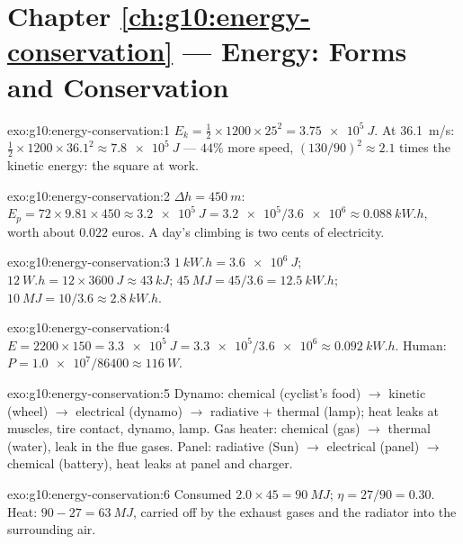 \section*{Chapter \ref{ch:g10:energy-conservation} --- Energy: Forms and Conservation}

\begin{solution}{exo:g10:energy-conservation:1}
$E_k = \tfrac12 \times 1200 \times 25^2 = \qty{3.75e5}{J}$. At
\qty{36.1}{m/s}: $\tfrac12 \times 1200 \times 36.1^2 \approx
\qty{7.8e5}{J}$ --- $44\%$ more speed, $(130/90)^2 \approx 2.1$
times the kinetic energy: the square at work.
\end{solution}

\begin{solution}{exo:g10:energy-conservation:2}
$\Delta h = \qty{450}{m}$:
$E_p = 72 \times 9.81 \times 450 \approx \qty{3.2e5}{J}
= \num{3.2e5}/\num{3.6e6} \approx \qty{0.088}{kW.h}$, worth about
$0.022$ euros. A day's climbing is two cents of electricity.
\end{solution}

\begin{solution}{exo:g10:energy-conservation:3}
$\qty{1}{kW.h} = \qty{3.6e6}{J}$;
$\qty{12}{W.h} = 12 \times \qty{3600}{J} \approx \qty{43}{kJ}$;
$\qty{45}{MJ} = 45/3.6 = \qty{12.5}{kW.h}$;
$\qty{10}{MJ} = 10/3.6 \approx \qty{2.8}{kW.h}$.
\end{solution}

\begin{solution}{exo:g10:energy-conservation:4}
$E = 2200 \times 150 = \qty{3.3e5}{J}
= \num{3.3e5}/\num{3.6e6} \approx \qty{0.092}{kW.h}$. Human:
$P = \num{1.0e7}/\num{86400} \approx \qty{116}{W}$.
\end{solution}

\begin{solution}{exo:g10:energy-conservation:5}
Dynamo: chemical (cyclist's food) $\to$ kinetic (wheel) $\to$
electrical (dynamo) $\to$ radiative $+$ thermal (lamp); heat leaks
at muscles, tire contact, dynamo, lamp. Gas heater: chemical (gas)
$\to$ thermal (water), leak in the flue gases. Panel: radiative
(Sun) $\to$ electrical (panel) $\to$ chemical (battery), heat leaks
at panel and charger.
\end{solution}

\begin{solution}{exo:g10:energy-conservation:6}
Consumed $2.0 \times 45 = \qty{90}{MJ}$; $\eta = 27/90 = 0.30$.
Heat: $90 - 27 = \qty{63}{MJ}$, carried off by the exhaust gases
and the radiator into the surrounding air.
\end{solution}

